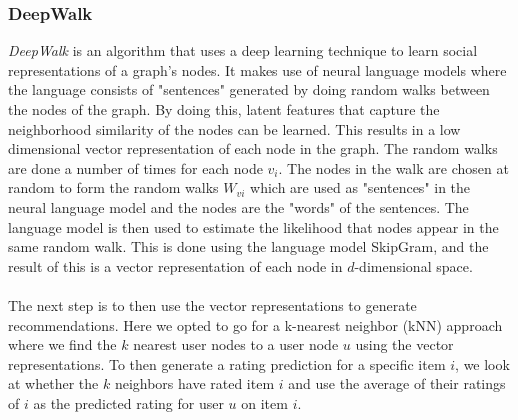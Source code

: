 \subsubsection{DeepWalk}
\textit{DeepWalk} is an algorithm that uses a deep learning technique to learn social representations of a graph's nodes\cite{DeepWalk}.
It makes use of neural language models where the language consists of "sentences" generated by doing random walks between the nodes of the graph.
By doing this, latent features that capture the neighborhood similarity of the nodes can be learned.
This results in a low dimensional vector representation of each node in the graph.
The random walks are done a number of times for each node $v_i$.
The nodes in the walk are chosen at random to form the random walks $W_{vi}$ which are used as "sentences" in the neural language model and the nodes are the "words" of the sentences.
The language model is then used to estimate the likelihood that nodes appear in the same random walk.
This is done using the language model SkipGram, and the result of this is a vector representation of each node in $d$-dimensional space.
\\\\
The next step is to then use the vector representations to generate recommendations.
Here we opted to go for a k-nearest neighbor (kNN) approach where we find the $k$ nearest user nodes to a user node $u$ using the vector representations.
To then generate a rating prediction for a specific item $i$, we look at whether the $k$ neighbors have rated item $i$ and use the average of their ratings of $i$ as the predicted rating for user $u$ on item $i$.
